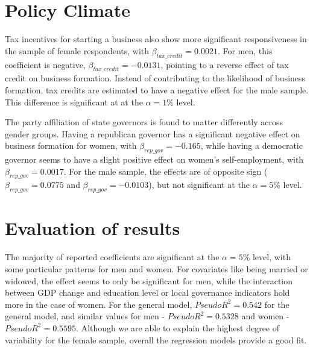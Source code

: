 \section{Policy Climate}
Tax incentives for starting a business also show more significant responsiveness in the sample of female respondents, with  $\beta_{tax\_credit} = 0.0021$. For men, this coefficient is negative, $\beta_{tax\_credit} = -0.0131$, pointing to a reverse effect of tax credit on business formation. Instead of contributing to the likelihood of business formation, tax credits are estimated to have a negative effect for the male sample. This difference is significant at at the $\alpha = 1\% $ level. 

The party affiliation of state governors is found to matter differently across gender groups. Having a republican governor has a significant negative effect on business formation for women, with $\beta_{rep\_gov} = -0.165$, while having a democratic governor seems to have a slight positive effect on women’s self-employment, with  $\beta_{rep\_gov} = 0.0017$. For the male sample, the effects are of opposite sign ($\beta_{rep\_gov} = 0.0775$ and $\beta_{rep\_gov} = -0.0103$), but not significant at the $\alpha = 5\% $ level. 

\section{Evaluation of results}

The majority of reported coefficients are significant at the $\alpha = 5\% $ level, with some particular patterns for men and women. For covariates like being married or widowed, the effect seems to only be significant for men, while the interaction between GDP change and education level or local governance indicators hold more in the case of women. For the general model, $PseudoR^2 = 0.542$ for the general model, and similar values for men - $PseudoR^2 = 0.5328$ and women - $PseudoR^2 = 0.5595$. Although we are able to explain the highest degree of variability for the female sample, overall the regression models provide a good fit.























